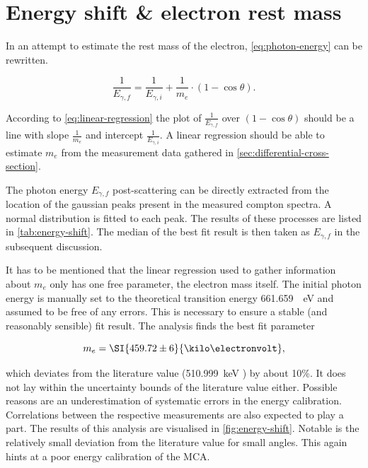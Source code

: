
\section{Energy shift \& electron rest mass}
\label{sec:energy-shift}

In an attempt to estimate the rest mass of the electron, \autoref{eq:photon-energy}
can be rewritten.

\begin{equation}
\label{eq:linear-regression}
\frac{1}{E_{\gamma,f}} = \frac{1}{E_{\gamma,i}} + \frac{1}{m_e}\cdot\left(1-\cos\theta\right).
\end{equation}

According to \autoref{eq:linear-regression} the plot of $\frac{1}{E_{\gamma,f}}$ over
$(1-\cos\theta)$ should be a line with slope $\frac{1}{m_e}$ and intercept 
$\frac{1}{E_{\gamma,i}}$. A linear regression should be able to estimate $m_e$ from
the measurement data gathered in \autoref{sec:differential-cross-section}.

The photon energy $E_{\gamma,f}$ post-scattering can be directly extracted from the 
location of the gaussian peaks present in the measured compton spectra. 
A normal distribution is fitted to each peak. The results
of these processes are listed in \autoref{tab:energy-shift}. The median of the best 
fit result is then taken as $E_{\gamma,f}$ in the subsequent discussion.



It has to be mentioned that the linear regression used to gather information about
$m_e$ only has one free parameter, the electron mass itself. The initial photon 
energy is manually set to the theoretical transition energy \SI{661.659}{\kilo
\electronvolt} and assumed to be free of any errors. This is necessary to ensure a 
stable (and reasonably  sensible) fit result. The analysis finds the best fit 
parameter

\begin{equation}
\label{eq:electron-mass-estimate}
	m_e = \SI{459.72 \pm 6}{\kilo\electronvolt},
\end{equation}

which deviates from the literature value (\SI{510.999}{\kilo\electronvolt}
\cite{patrignani2016review}) by about 10\%. It does not lay within the uncertainty
bounds of the literature value either. Possible reasons are an underestimation of 
systematic errors in the energy calibration. Correlations between the respective 
measurements are also expected to play a part. The results of this analysis are 
visualised in \autoref{fig:energy-shift}. Notable is the relatively small deviation 
from the literature value for small angles. This again hints at a poor energy calibration of the MCA.

